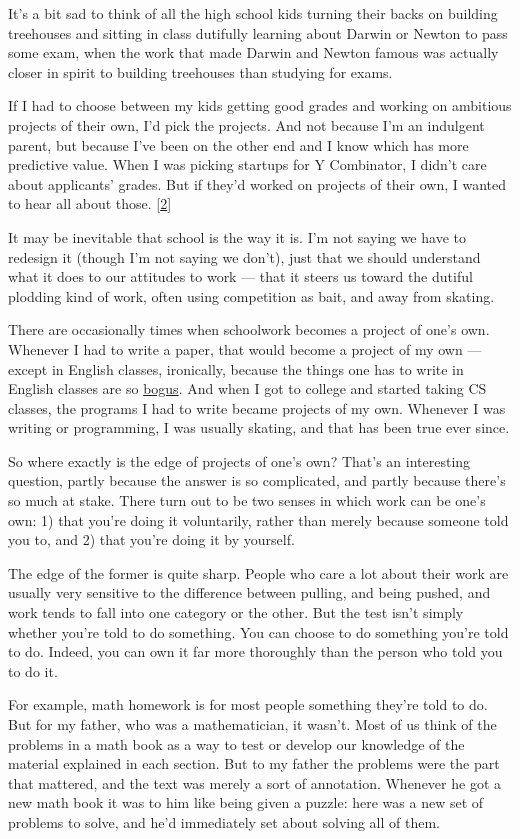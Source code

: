 It's a bit sad to think of all the high school kids turning their backs
on building treehouses and sitting in class dutifully learning about
Darwin or Newton to pass some exam, when the work that made Darwin and
Newton famous was actually closer in spirit to building treehouses than
studying for exams.

If I had to choose between my kids getting good grades and working on
ambitious projects of their own, I'd pick the projects. And not because
I'm an indulgent parent, but because I've been on the other end and I
know which has more predictive value. When I was picking startups for Y
Combinator, I didn't care about applicants' grades. But if they'd worked
on projects of their own, I wanted to hear all about those.
{[}\hyperref[f2n]{2}{]}

It may be inevitable that school is the way it is. I'm not saying we
have to redesign it (though I'm not saying we don't), just that we
should understand what it does to our attitudes to work --- that it
steers us toward the dutiful plodding kind of work, often using
competition as bait, and away from skating.

There are occasionally times when schoolwork becomes a project of one's
own. Whenever I had to write a paper, that would become a project of my
own --- except in English classes, ironically, because the things one
has to write in English classes are so \href{essay.html}{bogus}. And
when I got to college and started taking CS classes, the programs I had
to write became projects of my own. Whenever I was writing or
programming, I was usually skating, and that has been true ever since.

So where exactly is the edge of projects of one's own? That's an
interesting question, partly because the answer is so complicated, and
partly because there's so much at stake. There turn out to be two senses
in which work can be one's own: 1) that you're doing it voluntarily,
rather than merely because someone told you to, and 2) that you're doing
it by yourself.

The edge of the former is quite sharp. People who care a lot about their
work are usually very sensitive to the difference between pulling, and
being pushed, and work tends to fall into one category or the other. But
the test isn't simply whether you're told to do something. You can
choose to do something you're told to do. Indeed, you can own it far
more thoroughly than the person who told you to do it.

For example, math homework is for most people something they're told to
do. But for my father, who was a mathematician, it wasn't. Most of us
think of the problems in a math book as a way to test or develop our
knowledge of the material explained in each section. But to my father
the problems were the part that mattered, and the text was merely a sort
of annotation. Whenever he got a new math book it was to him like being
given a puzzle: here was a new set of problems to solve, and he'd
immediately set about solving all of them.

